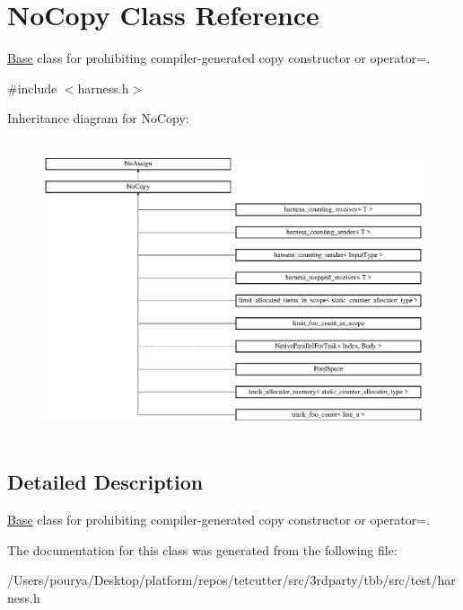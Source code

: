 \hypertarget{classNoCopy}{}\section{No\+Copy Class Reference}
\label{classNoCopy}


\hyperlink{structBase}{Base} class for prohibiting compiler-\/generated copy constructor or operator=.  




{\ttfamily \#include $<$harness.\+h$>$}

Inheritance diagram for No\+Copy\+:\begin{figure}[H]
\begin{center}
\leavevmode
\includegraphics[height=8.795812cm]{classNoCopy}
\end{center}
\end{figure}


\subsection{Detailed Description}
\hyperlink{structBase}{Base} class for prohibiting compiler-\/generated copy constructor or operator=. 

The documentation for this class was generated from the following file\+:\begin{DoxyCompactItemize}
\item 
/\+Users/pourya/\+Desktop/platform/repos/tetcutter/src/3rdparty/tbb/src/test/harness.\+h\end{DoxyCompactItemize}
